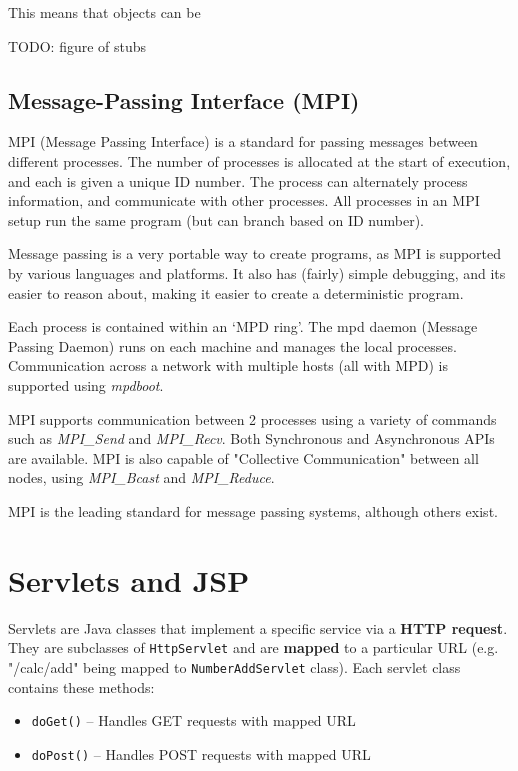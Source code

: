 \documentclass{article}
\begin{document}
This means that objects can be 

TODO: figure of stubs

\subsection{Message-Passing Interface (MPI)}

MPI (Message Passing Interface) is a standard for passing messages between different processes. The number of processes is allocated at the start of execution, and each is given a unique ID number. The process can alternately process information, and communicate with other processes. All processes in an MPI setup run the same program (but can branch based on ID number). 

Message passing is a very portable way to create programs, as MPI is supported by various languages and platforms. It also has (fairly) simple debugging, and its easier to reason about, making it easier to create a deterministic program. 

Each process is contained within an `MPD ring'. The mpd daemon (Message Passing Daemon) runs on each machine and manages the local processes. Communication across a network with multiple hosts (all with MPD) is supported using \textit{mpdboot}.

MPI supports communication between 2 processes using a variety of commands such as \textit{MPI\_Send} and \textit{MPI\_Recv}. Both Synchronous and Asynchronous APIs are available. MPI is also capable of "Collective Communication" between all nodes, using \textit{MPI\_Bcast} and \textit{MPI\_Reduce}.

MPI is the leading standard for message passing systems, although others exist.

\section{Servlets and JSP}

Servlets are Java classes that implement a specific service via a \textbf{HTTP request}. They are subclasses of \texttt{HttpServlet} and are \textbf{mapped} to a particular URL (e.g. "/calc/add" being mapped to \texttt{NumberAddServlet} class). Each servlet class contains these methods:
\begin{itemize}
	\item \texttt{doGet()} -- Handles GET requests with mapped URL
	\item \texttt{doPost()} -- Handles POST requests with mapped URL
\end{itemize}
\end{document}
